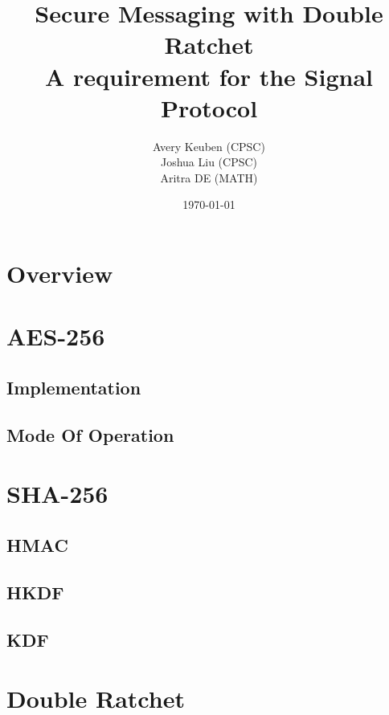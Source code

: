 

\title{Secure Messaging with Double Ratchet\\ A requirement for the Signal Protocol}
\author{Avery Keuben (CPSC)\\ Joshua Liu (CPSC)\\ Aritra DE (MATH)}
\date{\today}
  


\maketitle

\newpage

\section{Overview}


\section{AES-256}


\subsection{Implementation}


\subsection{Mode Of Operation}


\section{SHA-256}

\subsection{HMAC}

\subsection{HKDF}

\subsection{KDF}


\section{Double Ratchet}


